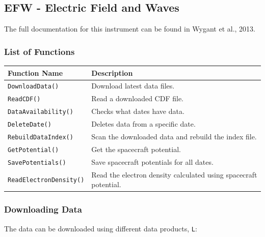 	\subsection{EFW - Electric Field and Waves}
	
	The full documentation for this instrument can be found in Wygant et al., 2013.
	
	\subsubsection{List of Functions}
	
	\begin{tabular}{|l|l|}
	\hline
	Function Name & Description \\
	\hline
	\texttt{DownloadData()} & Download latest data files. \\
	\texttt{ReadCDF()} & Read a downloaded CDF file. \\
	\texttt{DataAvailability()} & Checks what dates have data. \\
	\texttt{DeleteDate()} & Deletes data from a specific date. \\
	\texttt{RebuildDataIndex()} & Scan the downloaded data and rebuild the index file. \\
	\texttt{GetPotential()} & Get the spacecraft potential. \\
	\texttt{SavePotentials()} & Save spacecraft potentials for all dates. \\
	\texttt{ReadElectronDensity()} & Read the electron density calculated using spacecraft potential. \\
	\hline
	\end{tabular}
	
	\subsubsection{Downloading Data}
	
	The data can be downloaded using different data products, \texttt{L}:
	
